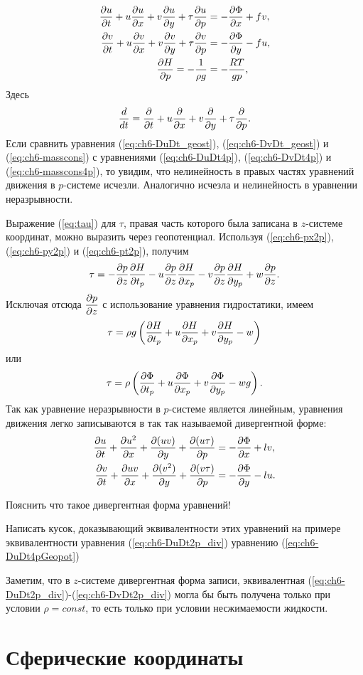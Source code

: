    \begin{align}
        \pd{u}{t}+u\pd{u}{x}+v\pd{u}{y}+\tau\pd{u}{p} &= - \pd{\Phi}{x}+fv, \label{eq:ch6-DuDt4pGeopot} \\
        \pd{v}{t}+u\pd{v}{x}+v\pd{v}{y}+\tau\pd{v}{p} &= -\pd{\Phi}{y}-fu, \label{eq:ch6-DvDt4pGeopot}\\
        \pd{H}{p}=-\frac{1}{\rho g}&=-\frac{RT}{gp}, \label{eq:ch6-DhDp4pGeopot}\\
   \end{align}
   Здесь 
   \begin{equation*}
       \td{}{t}=\pd{}{t}+u\pd{}{x}+v\pd{}{y}+\tau\pd{}{p}.
   \end{equation*}
   Если сравнить уравнения (\ref{eq:ch6-DuDt_geost}), (\ref{eq:ch6-DvDt_geost}) и (\ref{eq:ch6-masscons}) с уравнениями (\ref{eq:ch6-DuDt4p}), (\ref{eq:ch6-DvDt4p}) и (\ref{eq:ch6-masscons4p}), то увидим, что нелинейность в правых частях уравнений движения в $p$-системе исчезли. Аналогично исчезла и нелинейность в уравнении неразрывности.

   Выражение (\ref{eq:tau}) для $\tau$, правая часть которого была записана в $z$-системе координат, можно выразить через геопотенциал. Используя (\ref{eq:ch6-px2p}), (\ref{eq:ch6-py2p}) и (\ref{eq:ch6-pt2p}), получим
   \[
    \tau=-\pd{p}{z}\pd{H}{t_p}-u\pd{p}{z}\pd{H}{x_p}-v\pd{p}{z}\pd{H}{y_p}+w\pd{p}{z}.
   \]
   Исключая отсюда $\pd{p}{z}$ с использование уравнения гидростатики, имеем
   \begin{equation}
       \tau=\rho g \left( \pd{H}{t_p} + u\pd{H}{x_p} + v\pd{H}{y_p} - w \right)
   \end{equation}
   или
   \begin{equation}
       \tau=\rho \left( \pd{\Phi}{t_p} + u\pd{\Phi}{x_p} + v\pd{\Phi}{y_p} - wg \right).
   \end{equation}
   Так как уравнение неразрывности в $p$-системе является линейным, уравнения движения легко записываются в так так называемой дивергентной форме:
   \begin{align}
       \pd{u}{t} + \pd{u^2}{x} + \pd{(uv)}{y}  + \pd{(u \tau)}{p} &= -\pd{\Phi}{x}+lv, \label{eq:ch6-DuDt2p_div} \\
       \pd{v}{t} + \pd{uv}{x}  + \pd{(v^2)}{y} + \pd{(v \tau)}{p} &= -\pd{\Phi}{y}-lu. \label{eq:ch6-DvDt2p_div}
   \end{align}
   \begin{warn}
        Пояснить что такое дивергентная форма уравнений!
   \end{warn}
   \begin{warn}
        Написать кусок, доказывающий эквивалентности этих уравнений на примере эквивалентности уравнения (\ref{eq:ch6-DuDt2p_div}) уравнению (\ref{eq:ch6-DuDt4pGeopot})
   \end{warn}
   Заметим, что в $z$-системе дивергентная форма записи, эквивалентная (\ref{eq:ch6-DuDt2p_div})-(\ref{eq:ch6-DvDt2p_div}) могла бы быть получена только при условии $\rho=const$, то есть только при условии несжимаемости жидкости.
   
   

    
    

\section{Сферические координаты}





